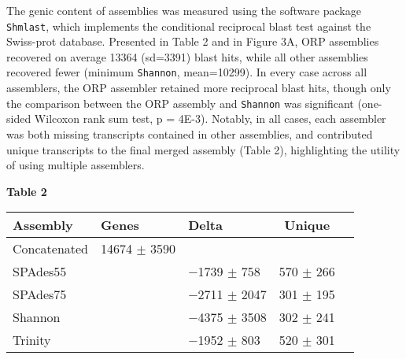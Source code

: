 \documentclass[10pt,letterpaper]{article}
\begin{document}
The genic content of assemblies was measured using the software package \texttt{Shmlast}, which implements the conditional reciprocal blast test against the Swiss-prot database. Presented in Table 2 and in Figure 3A, ORP assemblies recovered on average 13364 (sd=3391) blast hits, while all other assemblies recovered fewer (minimum \texttt{Shannon}, mean=10299). In every case across all assemblers, the ORP assembler retained more reciprocal blast hits, though only the comparison between the ORP assembly and \texttt{Shannon} was significant (one-sided Wilcoxon rank sum test, p = 4E-3). Notably, in all cases, each assembler was both missing transcripts contained in other assemblies, and contributed unique transcripts to the final merged assembly (Table 2), highlighting the utility of using multiple assemblers. \\

\newpage
\begin{center}
\textbf{\hypertarget{Table 2}{Table 2}} \\
\begin{tabular}{l l l c c }
\textbf{Assembly} & \textbf{Genes} & \textbf{Delta} & \textbf{Unique}   \\ \hline
Concatenated & 14674 $\pm$ 3590 &  &  \\ \hline
SPAdes55 &  & $-$1739 $\pm$ 758  & 570 $\pm$ 266  \\ \hline
SPAdes75 &  & $-$2711 $\pm$ 2047  & 301 $\pm$ 195  \\ \hline
Shannon &  & $-$4375 $\pm$ 3508  & 302 $\pm$ 241  \\ \hline
Trinity &  & $-$1952 $\pm$ 803  & 520 $\pm$ 301  \\ \hline


\end{tabular}
\end{center}
\begin{quote}
\end{quote}
\end{document}
